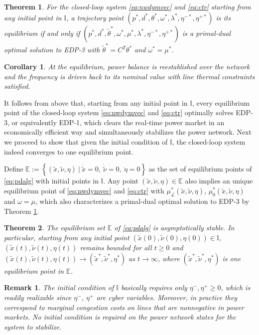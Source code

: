 \documentclass[journal,12pt,onecolumn,draftclsnofoot]{IEEEtran}
\newtheorem{theorem}{\textbf{Theorem}}
\newtheorem{remark}{\textbf{Remark}}
\newtheorem{corollary}{\textbf{Corollary}}
\begin{document}
\begin{theorem}\label{teo:eqlb}
	For the closed-loop system \eqref{eq:nwdymvec} and \eqref{eq:ctr} starting from any initial point in $\mathbb{I}$, a trajectory point $(p^*,d^*,\theta^*,\omega^*,\lambda^*,\eta^{-*},\eta^{+*})$	is its equilibrium if and only if $(p^*,d^*,\tilde{\theta}^*,\omega^*,\mu^*,\lambda^*,\eta^{-*},\eta^{+*})$ is a primal-dual optimal solution to EDP-3 with $\tilde\theta^*=C^T \theta^*$ and $\omega^*=\mu^*$.
\end{theorem}
\begin{corollary}
	At the equilibrium, power balance is reestablished over the network and the frequency is driven back to its nominal value with line thermal constraints satisfied.  
\end{corollary}
It follows from above that, starting from any initial point in $\mathbb{I}$, every equilibrium point of the closed-loop system \eqref{eq:nwdymvec} and \eqref{eq:ctr} optimally solves EDP-3, or equivalently EDP-1, which clears the real-time power market in an economically efficient way and simultaneously stabilizes the power network. Next we proceed to show that given the initial condition of $\mathbb{I}$, the closed-loop system indeed converges to one equilibrium point. 

Define $\mathbb{E}:=\left\{(\tilde{x},\tilde{\nu}, \eta) \ | \  \dot {\tilde x} = 0, ~ \dot {\tilde{\nu} }= 0,~ \dot \eta=0\right\}$ as the set of equilibrium points of \eqref{eq:pdalg} with initial points in $\mathbb{I}$. Any point $(\tilde{x},\tilde{\nu}, \eta)\in\mathbb{E}$ also implies an unique equilibrium point of \eqref{eq:nwdymvec} and \eqref{eq:ctr} with $\mu^*_{\mathcal{L}}(\tilde{x},\tilde{\nu}, \eta)$, $\mu^*_0(\tilde{x},\tilde{\nu}, \eta)$ and $\omega=\mu$, which also characterizes a primal-dual optimal solution to EDP-3 by Theorem \ref{teo:eqlb}.

\begin{theorem}\label{teo:stability}
    The equilibrium set $\mathbb{E}$ of \eqref{eq:pdalg} is asymptotically stable. In particular, starting from any initial point $(\tilde{x}(0),\tilde{\nu}(0), \eta(0))\in\mathbb{I}$, $(\tilde{x}(t),\tilde{\nu}(t), \eta(t))$ remains bounded for all $t\ge 0$ and $(\tilde{x}(t),\tilde{\nu}(t), \eta(t)) \rightarrow (\tilde{x}^*,\tilde{\nu}^*, \eta^*)$ as $t\rightarrow \infty$, where $(\tilde{x}^*,\tilde{\nu}^*, \eta^*)$ is one equilibrium point in $\mathbb{E}$.  
\end{theorem} 


\begin{remark}
The initial condition of $\mathbb{I}$ basically requires only $\eta^-,\eta^+\ge 0$, which is readily realizable since $\eta^-$, $\eta^+$ are cyber variables. Moreover, in practice they correspond to marginal congestion costs on lines that are nonnegative in power markets. No initial condition is required on the power network states for the system to stabilize. 	
\end{remark}
\end{document}
